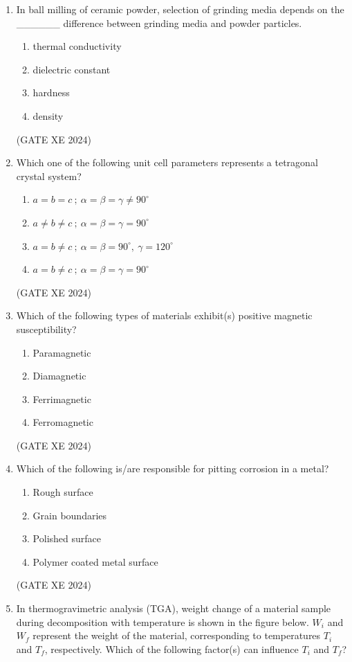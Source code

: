 \documentclass[12pt]{article}
\begin{document}
\begin{enumerate}
\item In ball milling of ceramic powder, selection of grinding media depends on the \_\_\_\_\_\_ difference between grinding media and powder particles.
\begin{enumerate}
\item thermal conductivity
\item dielectric constant
\item hardness
\item density
\end{enumerate}
(GATE XE 2024)

\item Which one of the following unit cell parameters represents a tetragonal crystal system?
\begin{enumerate}
\item $a = b = c \ ; \ \alpha = \beta = \gamma \neq 90^\circ$
\item $a \neq b \neq c \ ; \ \alpha = \beta = \gamma = 90^\circ$
\item $a = b \neq c \ ; \ \alpha = \beta = 90^\circ, \ \gamma = 120^\circ$
\item $a = b \neq c \ ; \ \alpha = \beta = \gamma = 90^\circ$
\end{enumerate}
(GATE XE 2024)

\item Which of the following types of materials exhibit(s) positive magnetic susceptibility?
\begin{enumerate}
\item Paramagnetic
\item Diamagnetic
\item Ferrimagnetic
\item Ferromagnetic
\end{enumerate}
(GATE XE 2024)

\item Which of the following is/are responsible for pitting corrosion in a metal?
\begin{enumerate}
\item Rough surface
\item Grain boundaries
\item Polished surface
\item Polymer coated metal surface
\end{enumerate}
(GATE XE 2024)

\item In thermogravimetric analysis (TGA), weight change of a material sample during decomposition with temperature is shown in the figure below. $W_i$ and $W_f$ represent the weight of the material, corresponding to temperatures $T_i$ and $T_f$, respectively. Which of the following factor(s) can influence $T_i$ and $T_f$?


\end{enumerate}
\end{document}
